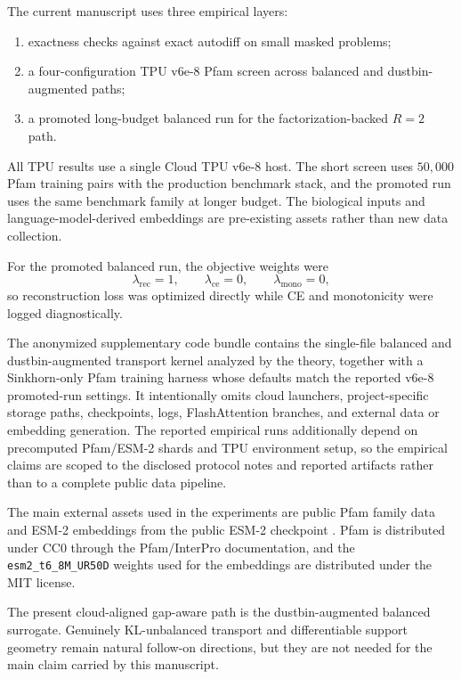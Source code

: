 \documentclass{article}
\begin{document}
The current manuscript uses three empirical layers:
\begin{enumerate}
    \item exactness checks against exact autodiff on small masked problems;
    \item a four-configuration TPU v6e-8 Pfam screen across balanced and dustbin-augmented paths;
    \item a promoted long-budget balanced run for the factorization-backed $R=2$ path.
\end{enumerate}

All TPU results use a single Cloud TPU v6e-8 host. The short screen uses $50{,}000$ Pfam training pairs with the production benchmark stack, and the promoted run uses the same benchmark family at longer budget. The biological inputs and language-model-derived embeddings are pre-existing assets rather than new data collection.

For the promoted balanced run, the objective weights were
\[
\lambda_{\mathrm{rec}}=1,\qquad \lambda_{\mathrm{ce}}=0,\qquad \lambda_{\mathrm{mono}}=0,
\]
so reconstruction loss was optimized directly while CE and monotonicity were logged diagnostically.

The anonymized supplementary code bundle contains the single-file balanced and dustbin-augmented transport kernel analyzed by the theory, together with a Sinkhorn-only Pfam training harness whose defaults match the reported v6e-8 promoted-run settings. It intentionally omits cloud launchers, project-specific storage paths, checkpoints, logs, FlashAttention branches, and external data or embedding generation. The reported empirical runs additionally depend on precomputed Pfam/ESM-2 shards and TPU environment setup, so the empirical claims are scoped to the disclosed protocol notes and reported artifacts rather than to a complete public data pipeline.

The main external assets used in the experiments are public Pfam family data \citep{mistry2021pfam} and ESM-2 embeddings from the public ESM-2 checkpoint \citep{lin2023evolutionary}. Pfam is distributed under CC0 through the Pfam/InterPro documentation, and the \texttt{esm2\_t6\_8M\_UR50D} weights used for the embeddings are distributed under the MIT license.

The present cloud-aligned gap-aware path is the dustbin-augmented balanced surrogate. Genuinely KL-unbalanced transport and differentiable support geometry remain natural follow-on directions, but they are not needed for the main claim carried by this manuscript.
\end{document}
